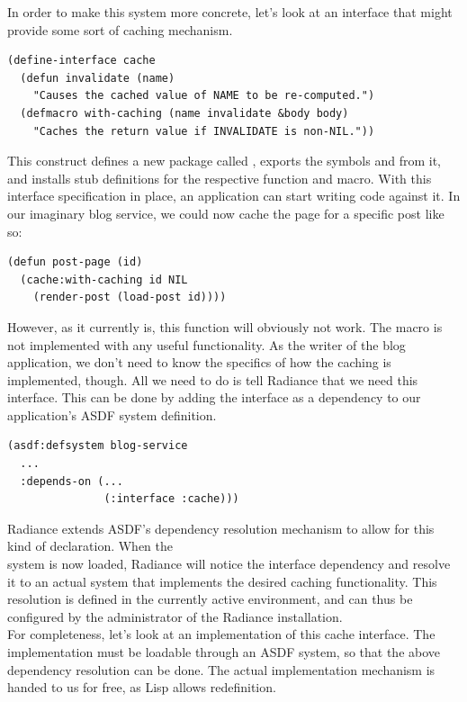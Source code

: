 \documentclass{sig-alternate}
\begin{document}
In order to make this system more concrete, let's look at an interface that might provide some sort of caching mechanism.

\begin{verbatim}
(define-interface cache
  (defun invalidate (name)
    "Causes the cached value of NAME to be re-computed.")
  (defmacro with-caching (name invalidate &body body)
    "Caches the return value if INVALIDATE is non-NIL."))
\end{verbatim}

This construct defines a new package called , exports the symbols  and  from it, and installs stub definitions for the respective function and macro. With this interface specification in place, an application can start writing code against it. In our imaginary blog service, we could now cache the page for a specific post like so:

\begin{verbatim}
(defun post-page (id)
  (cache:with-caching id NIL
    (render-post (load-post id))))
\end{verbatim}

However, as it currently is, this function will obviously not work. The  macro is not implemented with any useful functionality. As the writer of the blog application, we don't need to know the specifics of how the caching is implemented, though. All we need to do is tell Radiance that we need this interface. This can be done by adding the interface as a dependency to our application's ASDF\cite{asdf} system definition.

\begin{verbatim}
(asdf:defsystem blog-service
  ...
  :depends-on (...
               (:interface :cache)))
\end{verbatim}

Radiance extends ASDF's dependency resolution mechanism to allow for this kind of declaration. When the \\ system is now loaded, Radiance will notice the interface dependency and resolve it to an actual system that implements the desired caching functionality. This resolution is defined in the currently active environment, and can thus be configured by the administrator of the Radiance installation. \\

For completeness, let's look at an implementation of this cache interface. The implementation must be loadable through an ASDF system, so that the above dependency resolution can be done. The actual implementation mechanism is handed to us for free, as Lisp allows redefinition.
\end{document}
